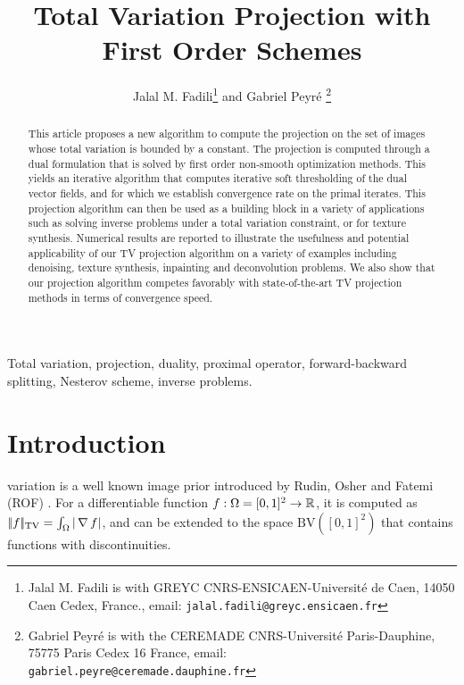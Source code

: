 \documentclass[11pt,nofonttune,a4paper]{IEEEtran}
\begin{document}
\title{Total Variation Projection with First Order Schemes}

\author{
Jalal M. Fadili\thanks{Jalal M. Fadili is with GREYC CNRS-ENSICAEN-Universit\'e de Caen, 
14050 Caen Cedex, France., email: \texttt{jalal.fadili@greyc.ensicaen.fr}} %
and Gabriel Peyr\'e \thanks{Gabriel Peyr\'e is with the CEREMADE CNRS-Universit\'e Paris-Dauphine, 
75775 Paris Cedex 16 France, email: \texttt{gabriel.peyre@ceremade.dauphine.fr}}
}


\maketitle

\begin{abstract}
This article proposes a new algorithm to compute the projection on the set of images whose total variation is bounded by a constant. The projection is computed through a dual formulation that is solved by first order non-smooth optimization methods. This yields an iterative algorithm that computes iterative soft thresholding of the dual vector fields, and for which we establish convergence rate on the primal iterates. This projection algorithm can then be used as a building block in a variety of applications such as solving inverse problems under a total variation constraint, or for texture synthesis. Numerical results are reported to illustrate the usefulness and potential applicability of our TV projection algorithm on a variety of examples including denoising, texture synthesis, inpainting and deconvolution problems. We also show that our projection algorithm competes favorably with state-of-the-art TV projection methods in terms of convergence speed.
\end{abstract}

\begin{IEEEkeywords}
Total variation, projection, duality, proximal operator, forward-backward splitting, Nesterov scheme, inverse problems.
\end{IEEEkeywords}

 

\section{Introduction}
 variation is a well known image prior introduced by Rudin, Osher and Fatemi (ROF) \cite{rudin-tv}. For a 
differentiable function $f : \Omega = [0,1]^2 \rightarrow \mathbb{R}$, it is computed as $|\!| f |\!|_{\text{TV}} = \int_{\Omega} | \operatorname{\nabla} f |$, and can be extended to the space $\text{BV}([0,1]^2)$ that contains functions with discontinuities. 
\end{document}
